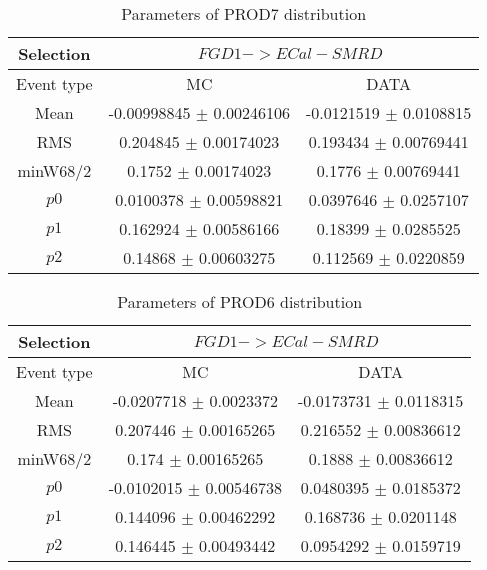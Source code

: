 \documentclass[a4paper,12pt]{article}
\begin{document}
\clearpage
\begin{table}[htbp]
\begin{center}
\begin{tabular}{|c|c|c|}
        \hline
        Selection & \multicolumn{2}{|c|}{$FGD1->ECal-SMRD$}  \\ \hline
        Event type & MC & DATA \\ 
        \hline
        Mean & -0.00998845 $\pm$ 0.00246106 & -0.0121519 $\pm$ 0.0108815 \\ 
        \hline 
        RMS & 0.204845 $\pm$ 0.00174023 & 0.193434 $\pm$ 0.00769441 \\ 
        \hline 
        minW68/2 & 0.1752 $\pm$ 0.00174023 & 0.1776 $\pm$ 0.00769441 \\ 
        \hline 
        $p0$ & 0.0100378 $\pm$ 0.00598821 & 0.0397646 $\pm$ 0.0257107 \\ 
        \hline 
        $p1$ & 0.162924 $\pm$ 0.00586166 & 0.18399 $\pm$ 0.0285525 \\ 
        \hline 
        $p2$ & 0.14868 $\pm$ 0.00603275 & 0.112569 $\pm$ 0.0220859 \\ 
        \hline 
\end{tabular}
\caption{Parameters of PROD7 distribution } \vspace{0.2in}
\label{xxx}
\end{center}
\end{table}
\begin{table}[htbp]
\begin{center}
\begin{tabular}{|c|c|c|}
        \hline
        Selection & \multicolumn{2}{|c|}{$FGD1->ECal-SMRD$}  \\ \hline
        Event type & MC & DATA \\ 
        \hline
        Mean & -0.0207718 $\pm$ 0.0023372 & -0.0173731 $\pm$ 0.0118315 \\ 
        \hline 
        RMS & 0.207446 $\pm$ 0.00165265 & 0.216552 $\pm$ 0.00836612 \\ 
        \hline 
        minW68/2 & 0.174 $\pm$ 0.00165265 & 0.1888 $\pm$ 0.00836612 \\ 
        \hline 
        $p0$ & -0.0102015 $\pm$ 0.00546738 & 0.0480395 $\pm$ 0.0185372 \\ 
        \hline 
        $p1$ & 0.144096 $\pm$ 0.00462292 & 0.168736 $\pm$ 0.0201148 \\ 
        \hline 
        $p2$ & 0.146445 $\pm$ 0.00493442 & 0.0954292 $\pm$ 0.0159719 \\ 
        \hline 
\end{tabular}
\caption{Parameters of PROD6 distribution } \vspace{0.2in}
\label{xxx}
\end{center}
\end{table}
\end{document}
